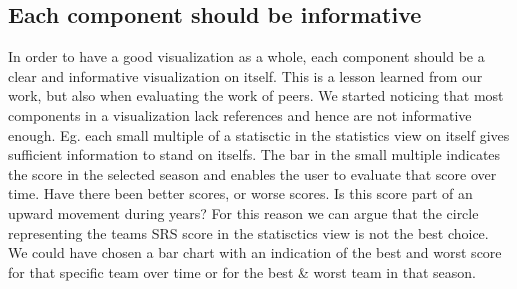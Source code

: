 \documentclass{sigchi}
\begin{document}
\subsection{Each component should be informative}
In order to have a good visualization as a whole, each component should be a clear and 
informative visualization on itself. This is a lesson learned from our work, but also when
evaluating the work of peers. We started noticing that most components in a visualization 
lack references and hence are not informative enough. Eg. each small multiple of a statisctic
in the statistics view on itself gives sufficient information to stand on itselfs. The bar in
the small multiple indicates the score in the selected season and enables the user to evaluate
that score over time. Have there been better scores, or worse scores. Is this score part of 
an upward movement during years? 
For this reason we can argue that the circle representing the teams SRS score in the statisctics
view is not the best choice. We could have chosen a bar chart with an indication of the best and
worst score for that specific team over time or for the best & worst team in that season.
\end{document}
